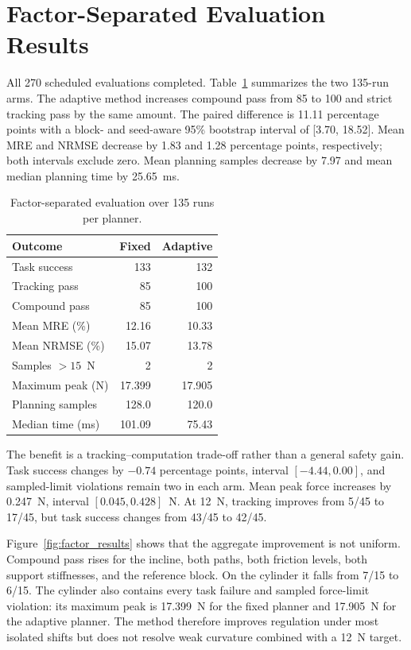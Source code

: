 \section{Factor-Separated Evaluation Results}
\label{sec:factor_results}

All 270 scheduled evaluations completed. Table~\ref{tab:factor_overall}
summarizes the two 135-run arms. The adaptive method increases compound pass from
85 to 100 and strict tracking pass by the same amount. The paired difference
is 11.11 percentage points with a block- and seed-aware 95\% bootstrap
interval of [3.70, 18.52]. Mean MRE and NRMSE decrease by 1.83 and 1.28
percentage points, respectively; both intervals exclude zero. Mean planning
samples decrease by 7.97 and mean median planning time by 25.65~ms.

\begin{table}[t]
\centering
\caption{Factor-separated evaluation over 135 runs per planner.}
\label{tab:factor_overall}
\small
\begin{tabular}{lrr}
\toprule
Outcome & Fixed & Adaptive \\
\midrule
Task success & 133 & 132 \\
Tracking pass & 85 & 100 \\
Compound pass & 85 & 100 \\
Mean MRE (\%) & 12.16 & 10.33 \\
Mean NRMSE (\%) & 15.07 & 13.78 \\
Samples $>15$~N & 2 & 2 \\
Maximum peak (N) & 17.399 & 17.905 \\
Planning samples & 128.0 & 120.0 \\
Median time (ms) & 101.09 & 75.43 \\
\bottomrule
\end{tabular}
\end{table}

The benefit is a tracking--computation trade-off rather than a general safety
gain. Task success changes by $-0.74$ percentage points, interval
$[-4.44,0.00]$, and sampled-limit violations remain two in each arm. Mean peak
force increases by 0.247~N, interval $[0.045,0.428]$~N. At 12~N, tracking
improves from 5/45 to 17/45, but task success changes from 43/45 to 42/45.

Figure~\ref{fig:factor_results} shows that the aggregate improvement is not
uniform. Compound pass rises for the incline, both paths, both friction levels,
both support stiffnesses, and the reference block. On the cylinder it falls
from 7/15 to 6/15. The cylinder also contains every task failure and sampled
force-limit violation: its maximum peak is 17.399~N for the fixed planner and
17.905~N for the adaptive planner. The method therefore improves regulation
under most isolated shifts but does not resolve weak curvature combined with
a 12~N target.

